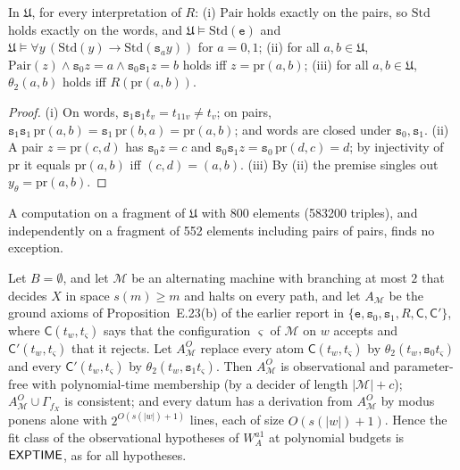 \begin{lemma}[Pairing]\label{lem:terms:pairing}
In $\mathfrak U$, for every interpretation of $R$: (i) $\mathrm{Pair}$ holds exactly on the pairs, so $\mathrm{Std}$ holds exactly on the words, and $\mathfrak U\models\mathrm{Std}(\mathtt e)$ and $\mathfrak U\models\forall y\,(\mathrm{Std}(y)\to\mathrm{Std}(\mathtt s_ay))$ for $a=0,1$; (ii) for all $a,b\in\mathfrak U$, $\mathrm{Pair}(z)\wedge\mathtt s_0z=a\wedge\mathtt s_0\mathtt s_1z=b$ holds iff $z=\mathrm{pr}(a,b)$; (iii) for all $a,b\in\mathfrak U$, $\theta_2(a,b)$ holds iff $R(\mathrm{pr}(a,b))$.
\end{lemma}

\begin{proof}
(i) On words, $\mathtt s_1\mathtt s_1t_v=t_{11v}\ne t_v$; on pairs, $\mathtt s_1\mathtt s_1\,\mathrm{pr}(a,b)=\mathtt s_1\,\mathrm{pr}(b,a)=\mathrm{pr}(a,b)$; and words are closed under $\mathtt s_0,\mathtt s_1$. (ii) A pair $z=\mathrm{pr}(c,d)$ has $\mathtt s_0z=c$ and $\mathtt s_0\mathtt s_1z=\mathtt s_0\,\mathrm{pr}(d,c)=d$; by injectivity of $\mathrm{pr}$ it equals $\mathrm{pr}(a,b)$ iff $(c,d)=(a,b)$. (iii) By (ii) the premise singles out $y_\theta=\mathrm{pr}(a,b)$.
\end{proof}

A computation on a fragment of $\mathfrak U$ with 800 elements (583200 triples), and independently on a fragment of 552 elements including pairs of pairs, finds no exception.

\begin{proposition}\label{prop:terms:a1fit}
Let $B=\emptyset$, and let $\mathcal M$ be an alternating machine with branching at most $2$ that decides $X$ in space $s(m)\ge m$ and halts on every path, and let $A_{\mathcal M}$ be the ground axioms of Proposition~E.23(b) of the earlier report in $\{\mathtt e,\mathtt s_0,\mathtt s_1,R,\mathsf C,\mathsf C'\}$, where $\mathsf C(t_w,t_\varsigma)$ says that the configuration $\varsigma$ of $\mathcal M$ on $w$ accepts and $\mathsf C'(t_w,t_\varsigma)$ that it rejects. Let $A^O_{\mathcal M}$ replace every atom $\mathsf C(t_w,t_\varsigma)$ by $\theta_2(t_w,\mathtt s_0t_\varsigma)$ and every $\mathsf C'(t_w,t_\varsigma)$ by $\theta_2(t_w,\mathtt s_1t_\varsigma)$. Then $A^O_{\mathcal M}$ is observational and parameter-free with polynomial-time membership (by a decider of length $\lvert\mathcal M\rvert+c$); $A^O_{\mathcal M}\cup\Gamma_{f_X}$ is consistent; and every datum has a derivation from $A^O_{\mathcal M}$ by modus ponens alone with $2^{O(s(\lvert w\rvert)+1)}$ lines, each of size $O(s(\lvert w\rvert)+1)$. Hence the fit class of the observational hypotheses of $W_A^{a1}$ at polynomial budgets is $\mathsf{EXPTIME}$, as for all hypotheses.
\end{proposition}

